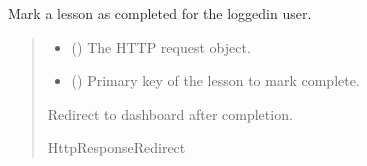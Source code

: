 \documentclass[letterpaper,10pt,english]{sphinxmanual}
\begin{document}
\begin{fulllineitems}
\label{\detokenize{courses:courses.views.complete_lesson}}
\pysigstartsignatures
\pysiglinewithargsret
{}
{\sphinxparamcomma {}}
{}
\pysigstopsignatures
\sphinxAtStartPar
Mark a lesson as completed for the logged\sphinxhyphen{}in user.
\begin{quote}\begin{description}
\begin{itemize}
\item {} 
\sphinxAtStartPar
{} () \textendash{} The HTTP request object.

\item {} 
\sphinxAtStartPar
{} () \textendash{} Primary key of the lesson to mark complete.

\end{itemize}

\sphinxAtStartPar
Redirect to dashboard after completion.

\sphinxAtStartPar
HttpResponseRedirect

\end{description}\end{quote}

\end{fulllineitems}

\end{document}
